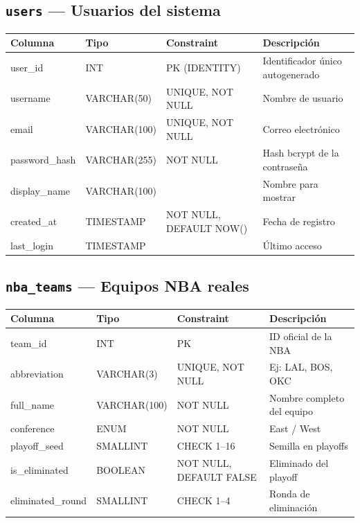 \documentclass[12pt,a4paper]{article}
\begin{document}
\subsection{\texttt{users} --- Usuarios del sistema}
\begin{tabular}{>{\ttfamily\small}l l l p{5.5cm}}
\toprule
\normalfont\textbf{Columna} & \textbf{Tipo} & \textbf{Constraint} & \textbf{Descripci\'on} \\
\midrule
user\_id & INT & PK (IDENTITY) & Identificador \'unico autogenerado \\
username & VARCHAR(50) & UNIQUE, NOT NULL & Nombre de usuario \\
email & VARCHAR(100) & UNIQUE, NOT NULL & Correo electr\'onico \\
password\_hash & VARCHAR(255) & NOT NULL & Hash bcrypt de la contrase\~na \\
display\_name & VARCHAR(100) & & Nombre para mostrar \\
created\_at & TIMESTAMP & NOT NULL, DEFAULT NOW() & Fecha de registro \\
last\_login & TIMESTAMP & & \'Ultimo acceso \\
\bottomrule
\end{tabular}

\subsection{\texttt{nba\_teams} --- Equipos NBA reales}
\begin{tabular}{>{\ttfamily\small}l l l p{5cm}}
\toprule
\normalfont\textbf{Columna} & \textbf{Tipo} & \textbf{Constraint} & \textbf{Descripci\'on} \\
\midrule
team\_id & INT & PK & ID oficial de la NBA \\
abbreviation & VARCHAR(3) & UNIQUE, NOT NULL & Ej: LAL, BOS, OKC \\
full\_name & VARCHAR(100) & NOT NULL & Nombre completo del equipo \\
conference & ENUM & NOT NULL & East / West \\
playoff\_seed & SMALLINT & CHECK 1--16 & Semilla en playoffs \\
is\_eliminated & BOOLEAN & NOT NULL, DEFAULT FALSE & Eliminado del playoff \\
eliminated\_round & SMALLINT & CHECK 1--4 & Ronda de eliminaci\'on \\
\bottomrule
\end{tabular}
\end{document}
